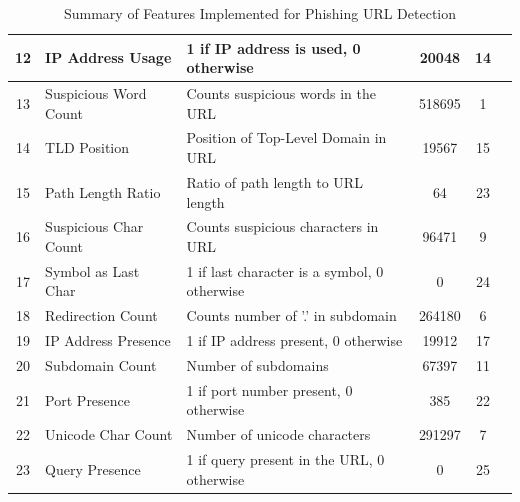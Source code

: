 \documentclass{article}
\begin{document}
\begin{table}[h]
\begin{tabular}{|c|l|p{6cm}|c|c|l|}
            12           & IP Address Usage      & 1 if IP address is used, 0 otherwise         & 20048              & 14                   &                 \\ \hline
            13           & Suspicious Word Count & Counts suspicious words in the URL           & 518695             & 1                    &                 \\ \hline
            14           & TLD Position          & Position of Top-Level Domain in URL          & 19567              & 15                   &                 \\ \hline
            15           & Path Length Ratio     & Ratio of path length to URL length           & 64                 & 23                   &                 \\ \hline
            16           & Suspicious Char Count & Counts suspicious characters in URL          & 96471              & 9                    &                 \\ \hline
            17           & Symbol as Last Char   & 1 if last character is a symbol, 0 otherwise & 0                  & 24                   &                 \\ \hline
            18           & Redirection Count     & Counts number of '.' in subdomain            & 264180             & 6                    &                 \\ \hline
            19           & IP Address Presence   & 1 if IP address present, 0 otherwise         & 19912              & 17                   &                 \\ \hline
            20           & Subdomain Count       & Number of subdomains                         & 67397              & 11                   &                 \\ \hline
            21           & Port Presence         & 1 if port number present, 0 otherwise        & 385                & 22                   &                 \\ \hline
            22           & Unicode Char Count    & Number of unicode characters                 & 291297             & 7                    &                 \\ \hline
            23           & Query Presence        & 1 if query present in the URL, 0 otherwise   & 0                  & 25                   &                 \\ \hline
        \end{tabular}
        \caption{Summary of Features Implemented for Phishing URL Detection}
        \label{table:features}
    \end{table}
\end{document}
